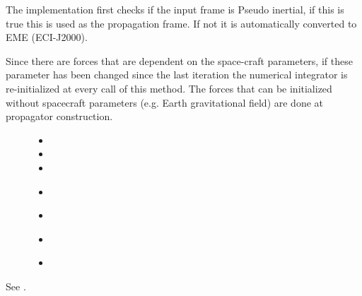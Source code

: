 \documentclass[letterpaper,10pt,english]{sphinxmanual}
\begin{document}
\begin{fulllineitems}
\begin{fulllineitems}
\begin{description}
\begin{itemize}
\end{itemize}

\end{description}

The implementation first checks if the input frame is Pseudo inertial, if this is true this is used as the propagation frame. If not it is automatically converted to EME (ECI-J2000).

Since there are forces that are dependent on the space-craft parameters, if these parameter has been changed since the last iteration the numerical integrator is re-initialized at every call of this method. The forces that can be initialized without spacecraft parameters (e.g. Earth gravitational field) are done at propagator construction.
\begin{description}
\item[{}] \leavevmode\begin{itemize}
\item {} 

\item {} 

\item {} 

\item {} 
{\hyperref[\detokenize{modules/dpt_tools:dpt_tools.kep2cart}]{}}

\item {} 
{\hyperref[\detokenize{modules/dpt_tools:dpt_tools.cart2kep}]{}}

\item {} 
{\hyperref[\detokenize{modules/dpt_tools:dpt_tools.true2mean}]{}}

\item {} 
{\hyperref[\detokenize{modules/dpt_tools:dpt_tools.mean2true}]{}}

\end{itemize}

\end{description}

See {\hyperref[\detokenize{modules/propagator_base:propagator_base.PropagatorBase.get_orbit}]{}}.


\end{fulllineitems}
\end{fulllineitems}
\end{document}
